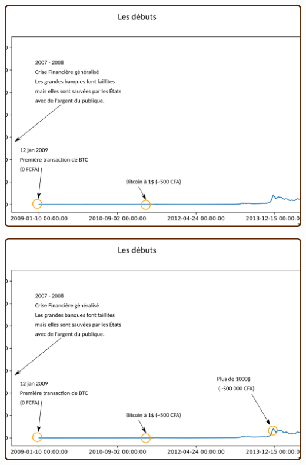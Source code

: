 \documentclass[presentation]{beamer}
\begin{document}
\begin{frame}[label={sec:org6089146}]{}
\begin{center}
\includegraphics[width=.95\textwidth]{./Pictures/Timeline/02debut_prix_1.png}
\end{center}
\end{frame}
\begin{frame}[label={sec:org8212f73}]{}
\begin{center}
\includegraphics[width=.95\textwidth]{./Pictures/Timeline/03debut_prix_1000.png}
\end{center}
\end{frame}
\end{document}
